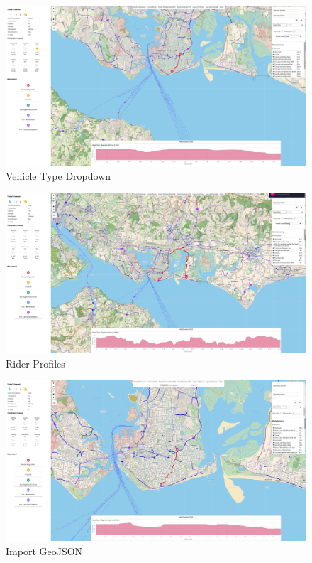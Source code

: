 \begin{figure}[!ht]
    \centering
    \includegraphics[width=425px]{figures/Progress Images/Iteration-3/SR46/SR46 - Vehicle Type Dropdown.png}
    \caption{Vehicle Type Dropdown}
    \label{fig:vehicle-type-dropdown}
\end{figure}

\begin{figure}[!ht]
    \centering
    \includegraphics[width=425px]{figures/Progress Images/Iteration-3/SR46/SR46-Rider Profiles.png}
    \caption{Rider Profiles}
    \label{fig:rider-profiles}
\end{figure}

\begin{figure}[!ht]
    \centering
    \includegraphics[width=425px]{figures/Progress Images/Iteration-3/SR48-49/SR49-Import-Geojson.png}
    \caption{Import GeoJSON}
    \label{fig:import-geojson}
\end{figure}

